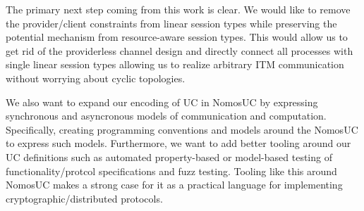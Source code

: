 The primary next step coming from this work is clear.
We would like to remove the provider/client constraints from linear session types while preserving the potential mechanism from resource-aware session types.
This would allow us to get rid of the providerless channel design and directly connect all processes with single linear session types allowing us to realize arbitrary
ITM communication without worrying about cyclic topologies.

We also want to expand our encoding of UC in NomosUC by expressing synchronous and asyncronous models of communication and computation. 
Specifically, creating programming conventions and models around the NomosUC to express such models.
Furthermore, we want to add better tooling around our UC definitions such as automated property-based or model-based testing of functionality/protcol specifications and fuzz testing. 
Tooling like this around NomosUC makes a strong case for it as a practical language for implementing cryptographic/distributed protocols.
